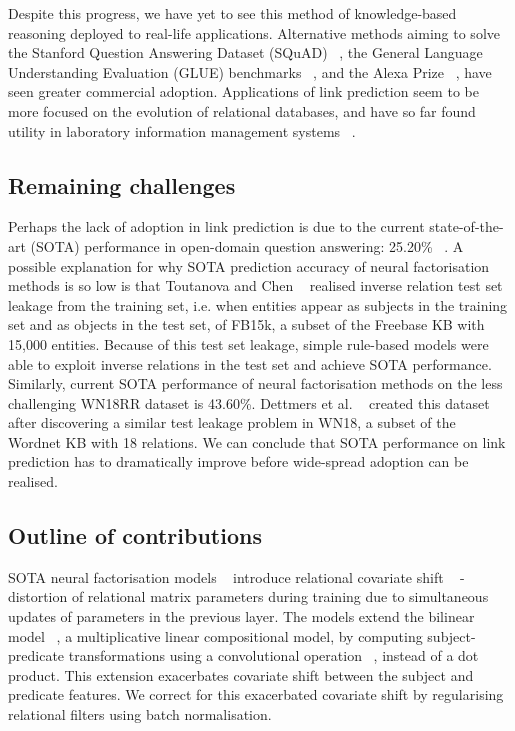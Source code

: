 \noindent Despite this progress, we have yet to see this method of knowledge-based reasoning deployed to real-life applications. Alternative methods aiming to solve the Stanford Question Answering Dataset (SQuAD) \unskip~\citep{rajpurkar2016squad}, the General Language Understanding Evaluation (GLUE) benchmarks \unskip~\citep{liu2019roberta}, and the Alexa Prize \unskip~\citep{ram2018conversational}, have seen greater commercial adoption. Applications of link prediction seem to be more focused on the evolution of relational databases, and have so far found utility in laboratory information management systems \unskip~\citep{HARROW20192068}. 

\subsection{Remaining challenges}

Perhaps the lack of adoption in link prediction is due to the current state-of-the-art (SOTA) performance in open-domain question answering: 25.20\% \unskip~\citep{balazevic2019hypernetwork}. A possible explanation for why SOTA prediction accuracy of neural factorisation methods is so low is that Toutanova and Chen \unskip~\citep{toutanova2015observed} realised inverse relation test set leakage from the training set, i.e. when entities appear as subjects in the training set and as objects in the test set, of FB15k, a subset of the Freebase KB with 15,000 entities. Because of this test set leakage, simple rule-based models were able to exploit inverse relations in the test set and achieve SOTA performance. Similarly, current SOTA performance of neural factorisation methods on the less challenging WN18RR dataset is 43.60\%. Dettmers et al. \unskip~\citep{dettmers2018convolutional} created this dataset after discovering a similar test leakage problem in WN18, a subset of the Wordnet KB with 18 relations. We can conclude that SOTA performance on link prediction has to dramatically improve before wide-spread adoption can be realised. 

\subsection{Outline of contributions}

SOTA neural factorisation models \unskip~\citep{balazevic2019hypernetwork, dettmers2018convolutional} introduce relational covariate shift \unskip~\citep{ioffe2015batch} - distortion of relational matrix parameters during training due to simultaneous updates of parameters in the previous layer. The models extend the bilinear model \unskip~\citep{jenatton2012latent}, a multiplicative linear compositional model, by computing subject-predicate transformations using a convolutional operation \unskip~\citep{zeiler2014visualizing}, instead of a dot product. This extension exacerbates covariate shift between the subject and predicate features. We correct for this exacerbated covariate shift by regularising relational filters using batch normalisation. \par

